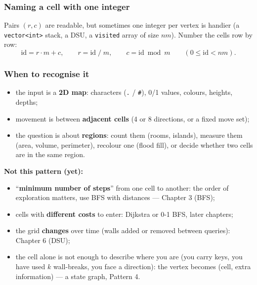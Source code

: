 \subsubsection*{Naming a cell with one integer}

Pairs $(r,c)$ are readable, but sometimes one integer per vertex is handier (a \texttt{vector<int>} stack, a DSU, a \texttt{visited} array of size $nm$). Number the cells row by row:
\[
\text{id} = r\cdot m + c, \qquad r = \text{id} \;/\; m, \qquad c = \text{id} \bmod m \qquad (0 \le \text{id} < nm).
\]
\begin{diagrambox}
\end{diagrambox}

\subsubsection*{When to recognise it}

\begin{itemize}[leftmargin=*]
    \item the input is a \textbf{2D map}: characters (\texttt{.} / \texttt{\#}), 0/1 values, colours, heights, depths;
    \item movement is between \textbf{adjacent cells} (4 or 8 directions, or a fixed move set);
    \item the question is about \textbf{regions}: count them (rooms, islands), measure them (area, volume, perimeter), recolour one (flood fill), or decide whether two cells are in the same region.
\end{itemize}
\textbf{Not this pattern (yet):}
\begin{itemize}[leftmargin=*]
    \item ``\textbf{minimum number of steps}'' from one cell to another: the order of exploration matters, use BFS with distances --- Chapter 3 (BFS);
    \item cells with \textbf{different costs} to enter: Dijkstra or 0-1 BFS, later chapters;
    \item the grid \textbf{changes} over time (walls added or removed between queries): Chapter 6 (DSU);
    \item the cell alone is not enough to describe where you are (you carry keys, you have used $k$ wall-breaks, you face a direction): the vertex becomes (cell, extra information) --- a state graph, Pattern 4.
\end{itemize}

